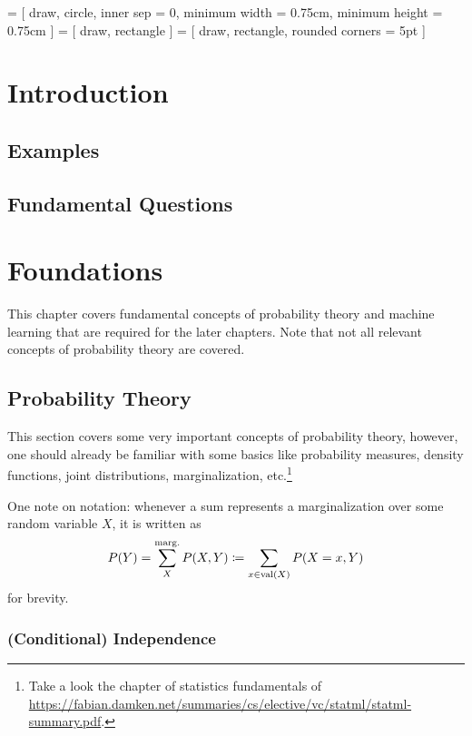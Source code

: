  = [
	draw,
	circle,
	inner sep = 0,
	minimum width = 0.75cm,
	minimum height = 0.75cm
]
 = [
	draw,
	rectangle
]
 = [
	draw,
	rectangle,
	rounded corners = 5pt
]

\chapter{Introduction} %

	\section{Examples} %

	\section{Fundamental Questions} %

\chapter{Foundations}
	This chapter covers fundamental concepts of probability theory and machine learning that are required for the later chapters. Note that not all relevant concepts of probability theory are covered.

	\section{Probability Theory}
		This section covers some very important concepts of probability theory, however, one should already be familiar with some basics like probability measures, density functions, joint distributions, marginalization, etc.\footnote{Take a look the chapter of statistics fundamentals of \url{https://fabian.damken.net/summaries/cs/elective/vc/statml/statml-summary.pdf}.}

		One note on notation: whenever a sum represents a marginalization over some random variable \(X\), it is written as
		\begin{equation}
		P(Y) = \sum_{X}^{\operatorname{marg.}} P(X, Y) \coloneqq \sum_{x \in \operatorname{val}(X)} P(X = x, Y)
		\end{equation}
		for brevity.

		\subsection{(Conditional) Independence}
			\label{subsec:condIndependence}

